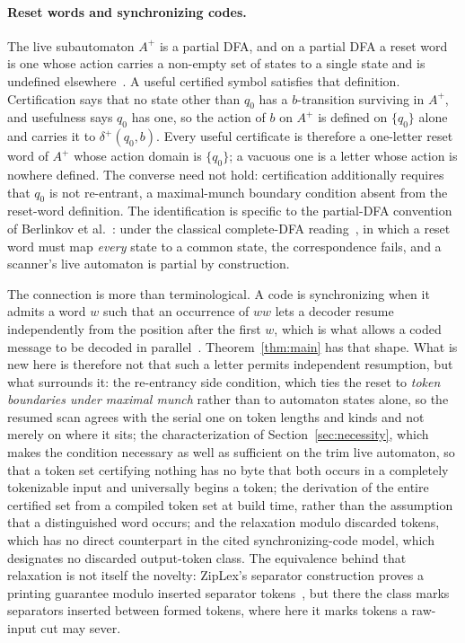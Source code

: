 \documentclass[11pt,a4paper]{article}
\theoremstyle{definition}
\theoremstyle{plain}
\begin{document}
\paragraph{Reset words and synchronizing codes.} The live subautomaton $A^+$ is a partial DFA, and on a partial DFA a
reset word is one whose action carries a non-empty set of states to a single state and is undefined
elsewhere~\cite{berlinkov2021partial}. A useful certified symbol satisfies that definition. Certification says that no
state other than $q_0$ has a $b$-transition surviving in $A^+$, and usefulness says $q_0$ has one, so the action of
$b$ on $A^+$ is defined on $\{q_0\}$ alone and carries it to $\delta^+(q_0, b)$. Every useful certificate is therefore
a one-letter reset word of $A^+$ whose action domain is $\{q_0\}$; a vacuous one is a letter whose action is nowhere
defined. The converse need not hold: certification additionally requires that $q_0$ is not re-entrant, a maximal-munch
boundary condition absent from the reset-word definition. The identification is specific to the partial-DFA convention
of Berlinkov et al.~\cite{berlinkov2021partial}: under the classical complete-DFA
reading~\cite{volkov2008synchronizing}, in which a reset word must map \emph{every} state to a common state, the
correspondence fails, and a scanner's live automaton is partial by construction.

The connection is more than terminological. A code is synchronizing when it admits a word $w$ such that an occurrence
of $ww$ lets a decoder resume independently from the position after the first $w$, which is what allows a coded
message to be decoded in parallel~\cite{berlinkov2021partial}. Theorem~\ref{thm:main} has that shape. What is new here
is therefore not that such a letter permits independent resumption, but what surrounds it: the re-entrancy side
condition, which ties the reset to \emph{token boundaries under maximal munch} rather than to automaton states alone,
so the resumed scan agrees with the serial one on token lengths and kinds and not merely on where it sits; the
characterization of Section~\ref{sec:necessity}, which makes the condition necessary as well as sufficient on the trim
live automaton, so that a token set certifying nothing has no byte that both occurs in a completely tokenizable input
and universally begins a token; the derivation of the entire certified set from a compiled token set at build time,
rather than the assumption that a distinguished word occurs; and the relaxation modulo discarded tokens, which has no
direct counterpart in the cited synchronizing-code model, which designates no discarded output-token class. The
equivalence behind that relaxation is not itself the novelty: ZipLex's separator construction proves a printing
guarantee modulo inserted separator tokens~\cite{chassot2026ziplex}, but there the class marks separators inserted
between formed tokens, where here it marks tokens a raw-input cut may sever.
\end{document}

